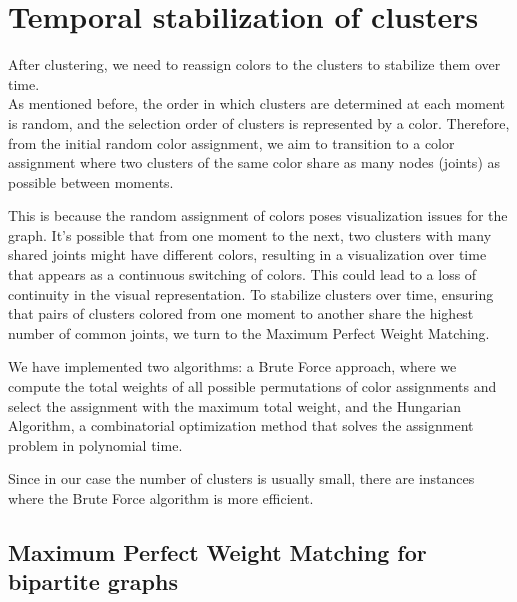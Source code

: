 \section{Temporal stabilization of clusters}

After clustering, we need to reassign colors to the clusters to stabilize them over time. \\
As mentioned before, the order in which clusters are determined at each moment is random, and the selection order of clusters is represented by a color. Therefore, from the initial random color assignment, we aim to transition to a color assignment where two clusters of the same color share as many nodes (joints) as possible between moments.

This is because the random assignment of colors poses visualization issues for the graph. It's possible that from one moment to the next, two clusters with many shared joints might have different colors, resulting in a visualization over time that appears as a continuous switching of colors. This could lead to a loss of continuity in the visual representation.
To stabilize clusters over time, ensuring that pairs of clusters colored from one moment to another share the highest number of common joints, we turn to the Maximum Perfect Weight Matching.

We have implemented two algorithms: a Brute Force approach, where we compute the total weights of all possible permutations of color assignments and select the assignment with the maximum total weight, and the Hungarian Algorithm, a combinatorial optimization method that solves the assignment problem in polynomial time.

Since in our case the number of clusters is usually small, there are instances where the Brute Force algorithm is more efficient.

\subsection{Maximum Perfect Weight Matching for bipartite graphs}

